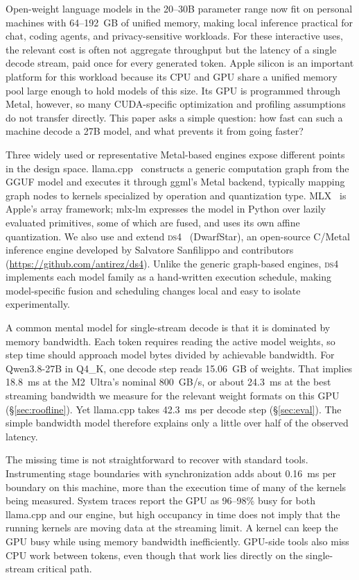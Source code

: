 \documentclass[11pt]{article}
\newcommand{\ds}{\textsc{ds4}}
\newcommand{\upstreamurl}{\url{https://github.com/antirez/ds4}}
\begin{document}
Open-weight language models in the 20--30B parameter range now fit on
personal machines with 64--192~GB of unified memory, making local inference
practical for chat, coding agents, and privacy-sensitive workloads. For
these interactive uses, the relevant cost is often not aggregate throughput
but the latency of a single decode stream, paid once for every generated
token. Apple silicon is an important platform for this workload because its
CPU and GPU share a unified memory pool large enough to hold models of this
size. Its GPU is programmed through Metal, however, so many CUDA-specific
optimization and profiling assumptions do not transfer directly. This paper
asks a simple question: how fast can such a machine decode a 27B model, and
what prevents it from going faster?

Three widely used or representative Metal-based engines expose different
points in the design space. llama.cpp~\cite{llamacpp} constructs a generic
computation graph from the GGUF model and executes it through ggml's Metal
backend, typically mapping graph nodes to kernels specialized by operation
and quantization type. MLX~\cite{mlx} is Apple's array framework; mlx-lm
expresses the model in Python over lazily evaluated primitives, some of
which are fused, and uses its own affine quantization. We also use and
extend \ds{}~\cite{ds4} (DwarfStar), an open-source C/Metal inference
engine developed by Salvatore Sanfilippo and contributors
(\upstreamurl{}). Unlike the generic graph-based engines, \ds{} implements
each model family as a hand-written execution schedule, making
model-specific fusion and scheduling changes local and easy to isolate
experimentally.

A common mental model for single-stream decode is that it is dominated by
memory bandwidth. Each token requires reading the active model weights, so
step time should approach model bytes divided by achievable bandwidth. For
Qwen3.8-27B in Q4\_K, one decode step reads 15.06~GB of weights. That
implies 18.8~ms at the M2~Ultra's nominal 800~GB/s, or about 24.3~ms at the
best streaming bandwidth we measure for the relevant weight formats on this
GPU (\S\ref{sec:roofline}). Yet llama.cpp takes 42.3~ms per decode step
(\S\ref{sec:eval}). The simple bandwidth model therefore explains only a
little over half of the observed latency.

The missing time is not straightforward to recover with standard tools.
Instrumenting stage boundaries with synchronization adds about 0.16~ms per
boundary on this machine, more than the execution time of many of the
kernels being measured. System traces report the GPU as 96--98\% busy for
both llama.cpp and our engine, but high occupancy in time does not imply
that the running kernels are moving data at the streaming limit. A kernel
can keep the GPU busy while using memory bandwidth inefficiently. GPU-side
tools also miss CPU work between tokens, even though that work lies
directly on the single-stream critical path.
\end{document}
